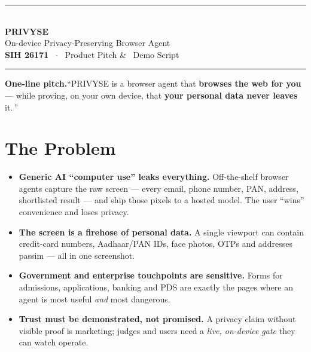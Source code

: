 \documentclass[11pt,a4paper]{article}
\title{}
\begin{document}
\begin{center}
  {\color{navy}\rule{\textwidth}{2.5pt}}\\[14pt]
  {\Huge\bfseries\color{navy} PRIVYSE}\\[6pt]
  {\large\color{dim} On-device Privacy-Preserving Browser Agent}\\[10pt]
  {\small\textbf{SIH 26171} \ $\cdot$ \ Product Pitch \& \ Demo Script}\\[4pt]
  {\color{teal}\rule{\textwidth}{1pt}}
\end{center}
\vspace{6pt}

\begin{voxbox}
\textbf{One-line pitch.}\quad ``PRIVYSE is a browser agent that
\textbf{browses the web for you} --- while proving, on your own device, that
\textbf{your personal data never leaves} it.\,''
\end{voxbox}

\section{The Problem}

\begin{itemize}
  \item \textbf{Generic AI ``computer use'' leaks everything.} Off-the-shelf
        browser agents capture the raw screen --- every email, phone number,
        PAN, address, shortlisted result --- and ship those pixels to a
        hosted model. The user ``wins'' convenience and loses privacy.
  \item \textbf{The screen is a firehose of personal data.} A single viewport
        can contain credit-card numbers, Aadhaar/PAN IDs, face photos,
        OTPs and addresses passim --- all in one screenshot.
  \item \textbf{Government and enterprise touchpoints are sensitive.}
        Forms for admissions, applications, banking and PDS are exactly the
        pages where an agent is most useful \emph{and} most dangerous.
  \item \textbf{Trust must be demonstrated, not promised.} A privacy claim
        without visible proof is marketing; judges and users need a
        \emph{live, on-device gate} they can watch operate.
\end{itemize}
\end{document}
